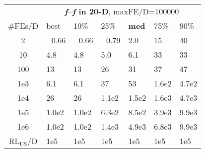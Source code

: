 \begin{tabular}{c|llllll}
 & \multicolumn{6}{|c}{\textbf{\textit{f}\raisebox{-0.35ex}{1}--\textit{f}\raisebox{-0.35ex}{8} in 20-D}, maxFE/D=100000}\\
\#FEs/D & best & 10\% & 25\% & \textbf{med} & 75\% & 90\%\\
2 & ~\,0.66 & ~\,0.66 & ~\,0.79 & \hspace*{1ex}2.0 & 15 & 40\\
10 & \hspace*{1ex}4.8 & \hspace*{1ex}4.8 & \hspace*{1ex}5.0 & \hspace*{1ex}6.1 & 33 & 33\\
100 & 13 & 13 & 26 & 31 & 37 & 47\\
1e3 & \hspace*{1ex}6.1 & \hspace*{1ex}6.1 & 37 & 53 & 1.6e2 & 4.7e2\\
1e4 & 26 & 26 & 1.1e2 & 1.5e2 & 1.6e3 & 4.7e3\\
1e5 & 1.0e2 & 1.0e2 & 6.3e2 & 8.5e2 & 3.9e3 & 9.9e3\\
1e6 & 1.0e2 & 1.0e2 & 1.4e3 & 4.9e3 & 6.8e3 & 9.9e3\\
$\text{RL}_{\text{US}}$/D & 1e5 & 1e5 & 1e5 & 1e5 & 1e5 & 1e5
\end{tabular}
